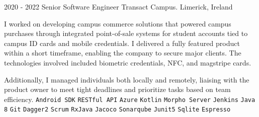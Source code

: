 \documentclass[9pt]{developercv} %
\begin{document}
\begin{entrylist}
	\entry
		{2020 - 2022}
		{Senior Software Engineer}
		{Transact Campus. Limerick, Ireland}
{

I worked on developing campus commerce solutions that powered campus purchases through integrated point-of-sale systems for student accounts tied to campus ID cards and mobile credentials. I delivered a fully featured product within a short timeframe, enabling the company to secure major clients. The technologies involved included biometric credentials, NFC, and magstripe cards.

Additionally, I managed individuals both locally and remotely, liaising with the product owner to meet tight deadlines and prioritize tasks based on team efficiency.
 	{
 		\texttt{Android SDK}\slashsep
		 \texttt{RESTful API}\slashsep
		 \texttt{Azure}\slashsep
		 \texttt{Kotlin}\slashsep
		 \texttt{Morpho Server}\slashsep
		 \texttt{Jenkins}\slashsep
		 \texttt{Java 8}\slashsep
		 \texttt{Git}\slashsep
		 \texttt{Dagger2}\slashsep
		 \texttt{Scrum}\slashsep
		 \texttt{RxJava}\slashsep
		 \texttt{Jacoco}\slashsep
		 \texttt{Sonarqube}\slashsep
		 \texttt{Junit5}\slashsep
		 \texttt{Sqlite}\slashsep
		 \texttt{Espresso}\slashsep
	}
}

\end{entrylist}
\end{document}
